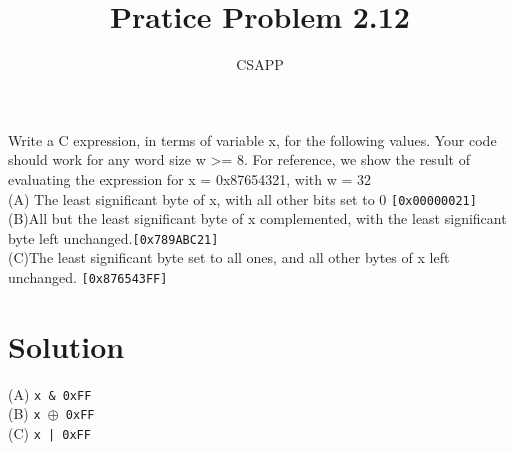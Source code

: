 \documentclass{article}
\title{Pratice Problem 2.12}
\author{CSAPP}
\begin{document}
    \maketitle
    \begin{flushleft}
        Write a C expression, in terms of variable x, for the following values.
        Your code should work for any word size w >= 8. For reference, we show the result of
        evaluating the expression for x = 0x87654321, with w = 32 \vspace{0.5em}\\
        (A) The least significant byte of x, with all other bits set
        to 0 \texttt{[0x00000021]} \vspace{0.5em}\\
        (B)All but the least significant byte of x complemented, with the least
        significant byte left unchanged.\texttt{[0x789ABC21]}\vspace{0.5em}\\
        (C)The least significant byte set to all ones, and all other bytes of
        x left unchanged. \texttt{[0x876543FF]}
        \bigskip

        \section*{\small Solution}
        (A) \texttt{x \& 0xFF}\\
        (B) \texttt{x $\oplus$~0xFF}\\
        (C) \texttt{x | 0xFF}
    \end{flushleft}
\end{document}
